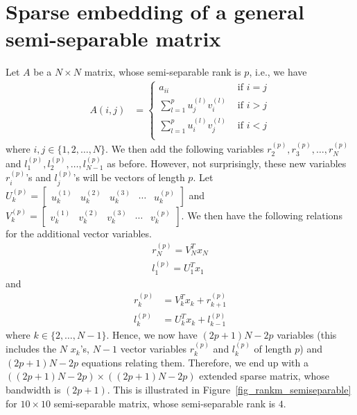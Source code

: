 \documentclass[final,leqno]{siamltex}
\begin{document}
\section{Sparse embedding of a general semi-separable matrix}
Let $A$ be a $N \times N$ matrix, whose semi-separable rank is $p$, i.e., we have
\begin{align}
A(i,j) & =
\begin{cases}
a_{ii} & \text{ if }i=j\\
\displaystyle\sum_{l=1}^p u_j^{(l)} v_i^{(l)} & \text{ if }i>j\\
\displaystyle\sum_{l=1}^p u_i^{(l)} v_j^{(l)} & \text{ if }i<j\\
\end{cases}
\end{align}
where $i,j \in \{1,2,\ldots,N\}$. We then add the following variables $r_2^{(p)},r_3^{(p)},\ldots,r_N^{(p)}$ and $l_1^{(p)},l_2^{(p)},\ldots,l_{N-1}^{(p)}$ as before. However, not surprisingly, these new variables $r_i^{(p)}$'s and $l_j^{(p)}$'s will be vectors of length $p$. Let $U_k^{(p)} = \begin{bmatrix} u_k^{(1)} & u_k^{(2)} & u_k^{(3)} & \cdots & u_k^{(p)}\end{bmatrix}$ and $V_k^{(p)} = \begin{bmatrix} v_k^{(1)} & v_k^{(2)} & v_k^{(3)} & \cdots & v_k^{(p)}\end{bmatrix}$. We then have the following relations for the additional vector variables.
\begin{align}
r_N^{(p)} = V_N^Tx_N\\
l_1^{(p)} = U_1^Tx_1
\end{align} and
\begin{align}
r_k^{(p)} & = V_k^T x_k + r_{k+1}^{(p)}\\
l_k^{(p)} & = U_k^T x_k + l_{k-1}^{(p)}
\end{align}
where $k \in \{2,\ldots,N-1\}$. Hence, we now have $(2p+1)N-2p$ variables (this includes the $N$ $x_k$'s, $N-1$ vector variables $r_k^{(p)}$ and $l_k^{(p)}$ of length $p$) and $(2p+1)N-2p$ equations relating them. Therefore, we end up with a $((2p+1)N-2p) \times ((2p+1)N-2p)$ extended sparse matrix, whose bandwidth is $(2p+1)$. This is illustrated in Figure~\ref{fig_rankm_semiseparable} for $10 \times 10$ semi-separable matrix, whose semi-separable rank is $4$.
\end{document}
